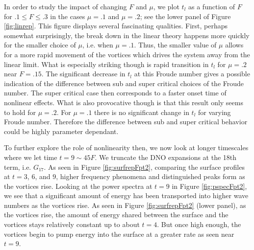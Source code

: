 \documentclass[a4paper,11pt]{article}
\begin{document}
In order to study the impact of changing $F$ and $\mu$, we plot $t_{l}$ as a function of $F$ for $.1\leq F \leq .3$ in the cases $\mu=.1$ and $\mu=.2$; see the lower panel of Figure \ref{fig:linrep}.  This figure displays several fascinating qualities.  First, perhaps somewhat surprisingly, the break down in the linear theory happens more quickly for the smaller choice of $\mu$, i.e. when $\mu=.1$.  Thus, the smaller value of $\mu$ allows for a more rapid movement of the vortices which drives the system away from the linear limit.  What is especially striking though is rapid transition in $t_{l}$ for $\mu=.2$ near $F=.15$.  The significant decrease in $t_{l}$ at this Froude number gives a possible indication of the difference between sub and super critical choices of the Froude number.   The super critical case then corresponds to a faster onset time of nonlinear effects.  What is also provocative though is that this result only seems to hold for $\mu=.2$.  For $\mu=.1$ there is no significant change in $t_{l}$ for varying Froude number.  Therefore the difference between sub and super critical behavior could be highly parameter dependant.  

To further explore the role of nonlinearity then, we now look at longer timescales where we let time $t = 9 \sim 45 F$.  We truncate the DNO expansions at the 18th term, i.e. $G_{17}$.  As seen in Figure \ref{fig:surfrepFpt2}, comparing the surface profiles at $t=3$, $6$, and $9$, higher frequency phenomena and distinguished peaks form as the vortices rise.  Looking at the power spectra at $t=9$ in Figure \ref{fig:pspecFpt2}, we see that a significant amount of energy has been transported into higher wave numbers as the vortices rise.
As seen in Figure \ref{fig:surfrepFpt2} (lower panel), as the vortices rise, the amount of energy shared between the surface and the vortices stays relatively constant up to about $t=4$.  But once high enough, the vortices begin to pump energy into the surface at a greater rate as seen near $t=9$.
\end{document}
